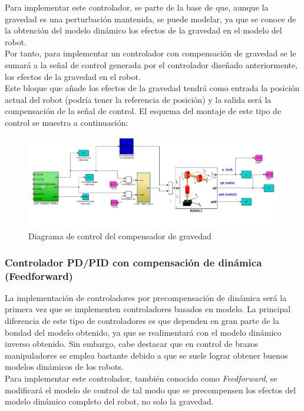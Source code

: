 Para implementar este controlador, se parte de la base de que, aunque la gravedad es una perturbación mantenida, se puede
modelar, ya que se conoce de la obtención del modelo dinámico los efectos de la gravedad en el modelo del robot.\\
Por tanto, para implementar un controlador con compensación de gravedad se le sumará a la señal de control generada por el
controlador diseñado anteriormente, los efectos de la gravedad en el robot.\\
Este bloque que añade los efectos de la gravedad tendrá como entrada la posición actual del robot (podría tener la referencia de posición) y la salida será la compensación de la señal de control. El esquema del montaje de este tipo de control se muestra a continuación:

\begin{figure}[h!]
	\centering
	\includegraphics[width=.8\textwidth]{montaje_grav}
	\caption{Diagrama de control del compensador de gravedad}
\end{figure}



\subsubsection{Controlador PD/PID con compensación de dinámica (Feedforward)}
La implementación de controladores por precompensación de dinámica será la primera vez que se implementen controladores basados en modelo. La principal diferencia de este tipo de controladores es que dependen en gran parte de la bondad del modelo obtenido, ya que se realimentará con el modelo dinámico inverso obtenido. Sin embargo, cabe destacar que en control de brazos manipuladores se emplea bastante debido a que se suele lograr obtener buenos modelos dinámicos de los robots.\\

Para implementar este controlador, también conocido como \textit{Feedforward}, se modificará el modelo de control de tal modo que se precompensen los efectos del modelo dinámico completo del robot, no solo la gravedad.

